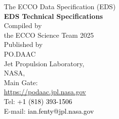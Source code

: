 \documentclass[letterpaper]{article}
\begin{document}
\pagebreak
\begin{center}
    \vspace*{2cm}
    {\Large The ECCO Data Specification (EDS)}\\[2cm]
    {\LARGE \textbf{EDS Technical Specifications}}\\[2cm]
    {\large Compiled by\\the ECCO Science Team 2025}\\[2cm]
    {\large Published by \\PO.DAAC\\
    Jet Propulsion Laboratory,\\
    NASA,\\
    Main Gate:\\
    \url{https://podaac.jpl.nasa.gov}}\\[2cm]
    {\large Tel: \textcolor{black}{+1 (818) 393-1506}\\[.5cm]
    E-mail: \textcolor{black}{ian.fenty@jpl.nasa.gov}}\\[2cm]
\end{center}



\end{document}
